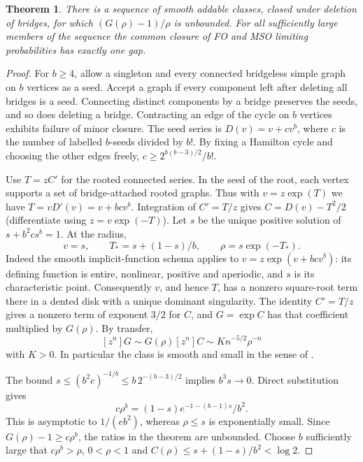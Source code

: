 \documentclass[11pt]{article}
\newtheorem{theorem}{Theorem}
\begin{document}
\begin{theorem}
There is a sequence of smooth addable classes, closed under deletion of bridges, for which $(G(\rho)-1)/\rho$ is unbounded. For all sufficiently large members of the sequence the common closure of FO and MSO limiting probabilities has exactly one gap.
\end{theorem}
\begin{proof}
For $b\ge4$, allow a singleton and every connected bridgeless simple graph on $b$ vertices as a seed. Accept a graph if every component left after deleting all bridges is a seed. Connecting distinct components by a bridge preserves the seeds, and so does deleting a bridge. Contracting an edge of the cycle on $b$ vertices exhibits failure of minor closure. The seed series is $D(v)=v+cv^b$, where $c$ is the number of labelled $b$-seeds divided by $b!$. By fixing a Hamilton cycle and choosing the other edges freely, $c\ge 2^{b(b-3)/2}/b!$.

Use $T=zC'$ for the rooted connected series. In the seed of the root, each vertex supports a set of bridge-attached rooted graphs. Thus with $v=z\exp(T)$ we have $T=vD'(v)=v+bcv^b$. Integration of $C'=T/z$ gives $C=D(v)-T^2/2$ (differentiate using $z=v\exp(-T)$). Let $s$ be the unique positive solution of $s+b^2cs^b=1$. At the radius,
\[
 v=s,\qquad T_*=s+(1-s)/b,\qquad \rho=s\exp(-T_*).
\]
Indeed the smooth implicit-function schema \cite[Theorem VII.3]{fs} applies to $v=z\exp(v+bcv^b)$: its defining function is entire, nonlinear, positive and aperiodic, and $s$ is its characteristic point. Consequently $v$, and hence $T$, has a nonzero square-root term there in a dented disk with a unique dominant singularity. The identity $C'=T/z$ gives a nonzero term of exponent $3/2$ for $C$, and $G=\exp C$ has that coefficient multiplied by $G(\rho)$. By transfer,
\[
 [z^n]G\sim G(\rho)[z^n]C\sim K n^{-5/2}\rho^{-n}
\]
with $K>0$. In particular the class is smooth and small in the sense of \cite{dawar}.

The bound $s\le(b^2c)^{-1/b}\le b\,2^{-(b-3)/2}$ implies $b^3s\to0$. Direct substitution gives
\[
 c\rho^b=(1-s)e^{-1-(b-1)s}/b^2.
\]
This is asymptotic to $1/(eb^2)$, whereas $\rho\le s$ is exponentially small. Since $G(\rho)-1\ge c\rho^b$, the ratios in the theorem are unbounded. Choose $b$ sufficiently large that $c\rho^b>\rho$, $0<\rho<1$ and $C(\rho)\le s+(1-s)/b^2<\log2$.


\end{proof}
\end{document}
